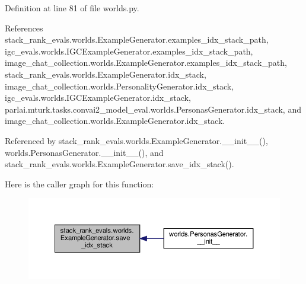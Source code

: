 Definition at line 81 of file worlds.\+py.



References stack\+\_\+rank\+\_\+evals.\+worlds.\+Example\+Generator.\+examples\+\_\+idx\+\_\+stack\+\_\+path, igc\+\_\+evals.\+worlds.\+I\+G\+C\+Example\+Generator.\+examples\+\_\+idx\+\_\+stack\+\_\+path, image\+\_\+chat\+\_\+collection.\+worlds.\+Example\+Generator.\+examples\+\_\+idx\+\_\+stack\+\_\+path, stack\+\_\+rank\+\_\+evals.\+worlds.\+Example\+Generator.\+idx\+\_\+stack, image\+\_\+chat\+\_\+collection.\+worlds.\+Personality\+Generator.\+idx\+\_\+stack, igc\+\_\+evals.\+worlds.\+I\+G\+C\+Example\+Generator.\+idx\+\_\+stack, parlai.\+mturk.\+tasks.\+convai2\+\_\+model\+\_\+eval.\+worlds.\+Personas\+Generator.\+idx\+\_\+stack, and image\+\_\+chat\+\_\+collection.\+worlds.\+Example\+Generator.\+idx\+\_\+stack.



Referenced by stack\+\_\+rank\+\_\+evals.\+worlds.\+Example\+Generator.\+\_\+\+\_\+init\+\_\+\+\_\+(), worlds.\+Personas\+Generator.\+\_\+\+\_\+init\+\_\+\+\_\+(), and stack\+\_\+rank\+\_\+evals.\+worlds.\+Example\+Generator.\+save\+\_\+idx\+\_\+stack().

Here is the caller graph for this function\+:
\nopagebreak
\begin{figure}[H]
\begin{center}
\leavevmode
\includegraphics[width=350pt]{classstack__rank__evals_1_1worlds_1_1ExampleGenerator_a47a988958641b4906b2d374938974cca_icgraph}
\end{center}
\end{figure}
\mbox{\label{classstack__rank__evals_1_1worlds_1_1ExampleGenerator_a47a988958641b4906b2d374938974cca}} 
